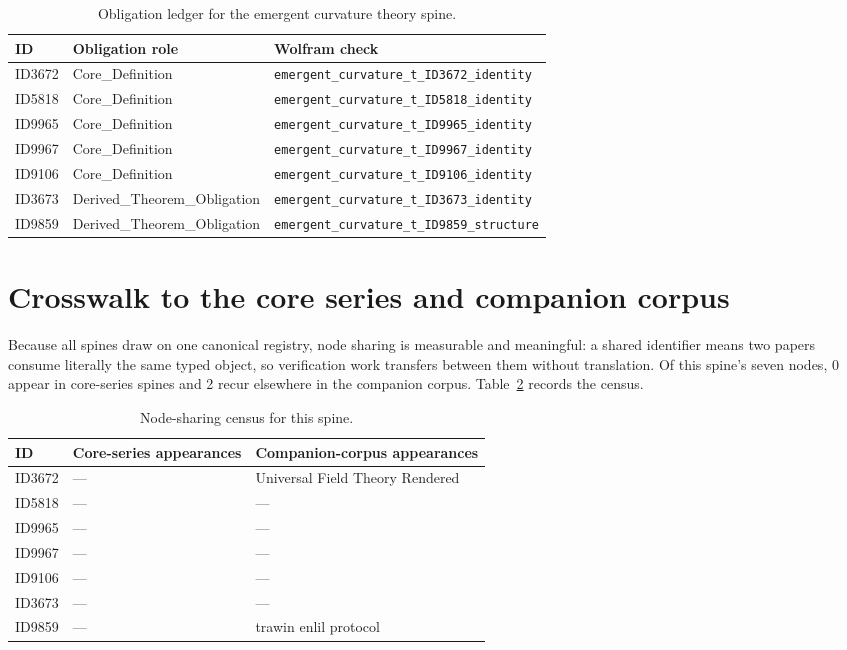 \documentclass[11pt]{article}
\theoremstyle{remark}
\begin{document}
\begin{table}[ht]
\centering
\small
\caption{Obligation ledger for the emergent curvature theory spine.}
\label{tab:obligations}
\begin{tabular}{llp{6.2cm}}
\toprule
ID & Obligation role & Wolfram check \\
\midrule
ID3672 & Core\_Definition & \texttt{emergent\_curvature\_t\_ID3672\_identity} \\
ID5818 & Core\_Definition & \texttt{emergent\_curvature\_t\_ID5818\_identity} \\
ID9965 & Core\_Definition & \texttt{emergent\_curvature\_t\_ID9965\_identity} \\
ID9967 & Core\_Definition & \texttt{emergent\_curvature\_t\_ID9967\_identity} \\
ID9106 & Core\_Definition & \texttt{emergent\_curvature\_t\_ID9106\_identity} \\
ID3673 & Derived\_Theorem\_Obligation & \texttt{emergent\_curvature\_t\_ID3673\_identity} \\
ID9859 & Derived\_Theorem\_Obligation & \texttt{emergent\_curvature\_t\_ID9859\_structure} \\
\bottomrule
\end{tabular}
\end{table}

\section{Crosswalk to the core series and companion corpus}
\label{sec:crosswalk}

Because all spines draw on one canonical registry, node sharing is measurable and meaningful: a shared identifier means two papers consume literally the same typed object, so verification work transfers between them without translation. Of this spine's seven nodes, 0 appear in core-series spines and 2 recur elsewhere in the companion corpus. Table~\ref{tab:crosswalk} records the census.

\begin{table}[ht]
\centering
\small
\caption{Node-sharing census for this spine.}
\label{tab:crosswalk}
\begin{tabular}{lp{4.4cm}p{6.6cm}}
\toprule
ID & Core-series appearances & Companion-corpus appearances \\
\midrule
ID3672 & --- & Universal Field Theory Rendered \\
ID5818 & --- & --- \\
ID9965 & --- & --- \\
ID9967 & --- & --- \\
ID9106 & --- & --- \\
ID3673 & --- & --- \\
ID9859 & --- & trawin enlil protocol \\
\bottomrule
\end{tabular}
\end{table}
\end{document}
